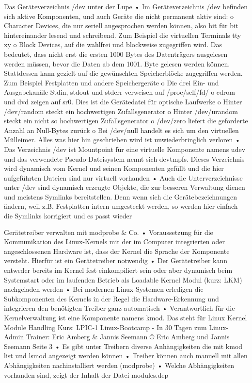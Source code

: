 Das Geräteverzeichnis /dev unter der Lupe
• Im Geräteverzeichnis /dev befinden sich aktive Komponenten, und auch Geräte die nicht
permanent aktiv sind:
o Character Devices, die nur seriell angesprochen werden können, also bit für bit
hintereinander lesend und schreibend.
Zum Beispiel die virtuellen Terminals tty xy
o Block Devices, auf die wahlfrei und blockweise zugegriffen wird. Das bedeutet, dass
nicht erst die ersten 1000 Bytes des Datenträgers ausgelesen werden müssen, bevor
die Daten ab dem 1001. Byte gelesen werden können. Stattdessen kann gezielt auf
die gewünschten Speicherblöcke zugegriffen werden.
Zum Beispiel Festplatten und andere Speichergeräte
o Die drei Ein- und Ausgabekanäle Stdin, stdout und stderr verweisen auf
/proc/self/fd/
o cdrom und dvd zeigen auf sr0. Dies ist die Gerätedatei für optische Laufwerke
o Hinter /dev/random steckt ein hochwertigen Zufallsgenerator
o Hinter /dev/urandom steckt ein nicht so hochwertigen Zufallsgenerator
o /dev/zero liefert die geforderte Anzahl an Null-Bytes zurück
o Bei /dev/null handelt es sich um den virtuellen Mülleimer. Alles was hier hin
geschrieben wird ist unwiederbringlich verloren
• Das Verzeichnis /dev ist Mountpoint für eine virtuelle Komponente namens udev und das
verwendete Pseudo-Dateisystem nennt sich devtmpfs. Dieses Verzeichnis wird dynamisch
vom Kernel und seinen Komponenten gefüllt und die hier aufgeführten Dateien sind nur
virtuell vorhanden
• Auch die Unterverzeichnisse unter /dev sind dynamisch erzeugte Objekte, die zur besseren
Verwaltung dienen und meistens Symlinks bereitstellen. Denn wenn sich die
Gerätebezeichnungen ändern, weil z.B. Festplatten intern umgesteckt werden, so werden
hier einfach die Symlinks korrigiert und es passt wieder



Gerätetreiber verwalten mit modprobe & Co.
• Voraussetzung für die Kommunikation des Linux-Kernels mit der im Computer integrierten
oder angeschlossenen Hardware ist, dass der Kernel die Sprache der Komponente versteht.
Hierfür ist ein Gerätetreiber notwendig
• Der Gerätetreiber kann entweder bereits im Kernel fest einkompiliert sein oder aber
dynamisch beim Systemstart oder im laufenden Betrieb als Loadable Kernel Modul (kurz:
LKM) nachgeladen werden
• Bei modernen Linux-Systemen erledigen die Subkomponenten des Kernels in der Regel die
Hardware-Erkennung und integrieren den benötigten Treiber ganz automatisch
• Verantwortlich für die Kernelverwaltung ist eine Komponente namens kmod. Das steht für
Linux Kernel Module Handling 
Kurs: LPIC-1 Linux-Bootcamp - In 30 Tagen zum Linux-Admin
Trainer: Eric Amberg & Jannis Seemann
© Eric Amberg und Jannis Seemann Seite 3
• Es gibt unter Treibern diverse Anhängigkeiten die mit kmod list und lsmod angezeigt
werden können
• Treiber können auch manuell mit allen Abhängigkeiten nachinstalliert werden (modprobe)
• Welche Abhängigkeiten vorhanden sind, zeigt der Inhalt der Datei modules.dep



